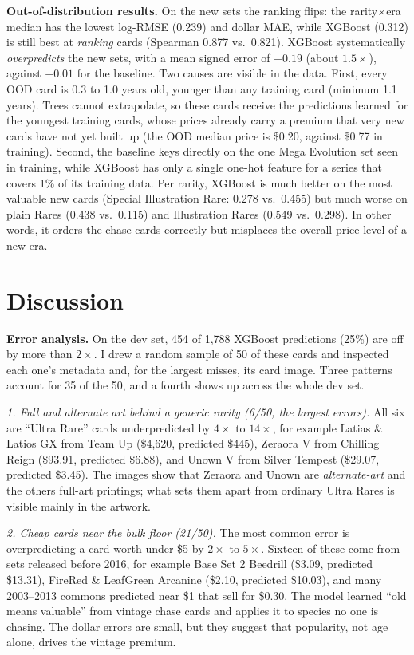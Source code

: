 \documentclass{article}
\begin{document}
\textbf{Out-of-distribution results.} On the new sets the ranking flips: the rarity$\times$era median has the lowest log-RMSE (0.239) and dollar MAE, while XGBoost (0.312) is still best at \emph{ranking} cards (Spearman 0.877 vs.\ 0.821). XGBoost systematically \emph{overpredicts} the new sets, with a mean signed error of $+0.19$ (about $1.5\times$), against $+0.01$ for the baseline. Two causes are visible in the data. First, every OOD card is 0.3 to 1.0 years old, younger than any training card (minimum 1.1 years). Trees cannot extrapolate, so these cards receive the predictions learned for the youngest training cards, whose prices already carry a premium that very new cards have not yet built up (the OOD median price is \$0.20, against \$0.77 in training). Second, the baseline keys directly on the one Mega Evolution set seen in training, while XGBoost has only a single one-hot feature for a series that covers 1\% of its training data. Per rarity, XGBoost is much better on the most valuable new cards (Special Illustration Rare: 0.278 vs.\ 0.455) but much worse on plain Rares (0.438 vs.\ 0.115) and Illustration Rares (0.549 vs.\ 0.298). In other words, it orders the chase cards correctly but misplaces the overall price level of a new era.

\section{Discussion}

\textbf{Error analysis.} On the dev set, 454 of 1{,}788 XGBoost predictions (25\%) are off by more than $2\times$. I drew a random sample of 50 of these cards and inspected each one's metadata and, for the largest misses, its card image. Three patterns account for 35 of the 50, and a fourth shows up across the whole dev set.

\emph{1. Full and alternate art behind a generic rarity (6/50, the largest errors).} All six are ``Ultra Rare'' cards underpredicted by $4\times$ to $14\times$, for example Latias \& Latios GX from Team Up (\$4{,}620, predicted \$445), Zeraora V from Chilling Reign (\$93.91, predicted \$6.88), and Unown V from Silver Tempest (\$29.07, predicted \$3.45). The images show that Zeraora and Unown are \emph{alternate-art} and the others full-art printings; what sets them apart from ordinary Ultra Rares is visible mainly in the artwork.

\emph{2. Cheap cards near the bulk floor (21/50).} The most common error is overpredicting a card worth under \$5 by $2\times$ to $5\times$. Sixteen of these come from sets released before 2016, for example Base Set 2 Beedrill (\$3.09, predicted \$13.31), FireRed \& LeafGreen Arcanine (\$2.10, predicted \$10.03), and many 2003--2013 commons predicted near \$1 that sell for \$0.30. The model learned ``old means valuable'' from vintage chase cards and applies it to species no one is chasing. The dollar errors are small, but they suggest that popularity, not age alone, drives the vintage premium.
\end{document}
